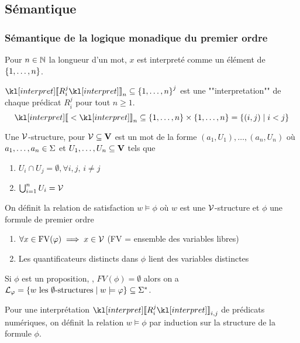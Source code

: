 \subsection{Sémantique}

\subsubsection{Sémantique de la logique monadique du premier ordre}

Pour $n \in \mathbb{N}$ la longueur d'un mot, $x$ est interpreté comme un élément de $\left\{1, \ldots, n\right\}$.

$ \interpret {R_i^j}_n \subseteq \set {1, \ldots, n}^j$ est une ""interpretation"" de chaque prédicat $R_i^j$ pour tout $n \geq 1$.
$$ \interpret {<}_n \subseteq \set {1, \ldots, n} \times \set {1, \ldots, n} = \setdef {(i,j)} {i<j}$$


\begin{definition}
	Une $\mathcal{V}$-structure, pour $\mathcal{V} \subseteq \mathbf{V}$ est un mot de la forme $(a_1, U_1), \ldots, (a_n, U_n)$ où $a_1, \ldots, a_n \in \Sigma$ et
	$U_1, \ldots, U_n \subseteq \mathbf{V}$ tels que

	\begin{enumerate}
		\item $U_i \cap U_j = \emptyset, \forall i,j, \, i \neq j$
		\item  $\bigcup_{i=1}^n U_i = \mathcal{V}$
	\end{enumerate}
\end{definition}

\begin{definition}
	On définit la relation de satisfaction $w \models \phi$ où $w$ est une $\mathcal{V}$-structure et $\phi$ une formule de premier ordre \tq
	\begin{enumerate}
		\item $\forall x \in \text{FV}(\varphi) \implies x \in \mathcal{V}$ (FV = ensemble des variables libres)
		\item Les quantificateurs distincts dans $\phi$ lient des variables distinctes
	\end{enumerate}
\end{definition}

Si $\phi$ est un proposition, \cad, $FV(\phi) = \emptyset$ alors on a $\mathcal{L}_{\varphi} = \left\{w \text { les } \emptyset\text{-structures} \mid w \models \varphi\right\} \subseteq \Sigma^{*}$.


Pour une interprétation $\interpret {R_i^j}_{{i,j}}$ de prédicats numériques, on définit la relation $w \models \phi$ par induction sur la structure de la formule $\phi$.

